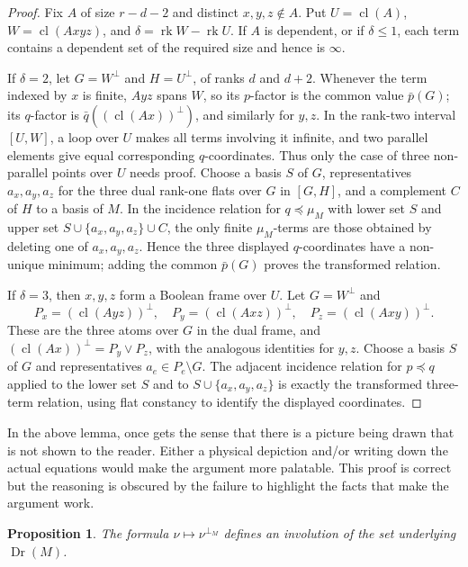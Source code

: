 \documentclass[12pt]{article}
\newcommand{\Dr}{\operatorname{Dr}}
\newcommand{\rk}{\operatorname{rk}}
\newcommand{\cl}{\operatorname{cl}}
\newtheorem{proposition}{Proposition}
\newcommand{\review}[1]{\begin{reviewbox}#1\end{reviewbox}}
\begin{document}
\begin{proof}
Fix $A$ of size $r-d-2$ and distinct $x,y,z\notin A$.  Put
$U=\cl(A)$, $W=\cl(Axyz)$, and $\delta=\rk W-\rk U$.  If $A$ is
dependent, or if $\delta\le1$, each term contains a dependent set of the
required size and hence is $\infty$.

If $\delta=2$, let $G=W^\perp$ and $H=U^\perp$, of ranks $d$ and
$d+2$.  Whenever the term indexed by $x$ is finite, $Ayz$ spans $W$,
so its $p$-factor is the common value $\bar p(G)$; its $q$-factor is
$\bar q((\cl(Ax))^\perp)$, and similarly for $y,z$.  In the rank-two
interval $[U,W]$, a loop over $U$ makes all terms involving it
infinite, and two parallel elements give equal corresponding
$q$-coordinates.  Thus only the case of three non-parallel points over
$U$ needs proof.  Choose a basis $S$ of $G$, representatives
$a_x,a_y,a_z$ for the three dual rank-one flats over $G$ in $[G,H]$,
and a complement $C$ of $H$ to a basis of $M$.  In the incidence
relation for $q\preceq\mu_M$ with lower set $S$ and upper set
$S\cup\{a_x,a_y,a_z\}\cup C$, the only finite $\mu_M$-terms are those
obtained by deleting one of $a_x,a_y,a_z$.  Hence the three displayed
$q$-coordinates have a non-unique minimum; adding the common
$\bar p(G)$ proves the transformed relation.

If $\delta=3$, then $x,y,z$ form a Boolean frame over $U$.  Let
$G=W^\perp$ and
\[
 P_x=(\cl(Ayz))^\perp,\quad P_y=(\cl(Axz))^\perp,\quad
 P_z=(\cl(Axy))^\perp .
\]
These are the three atoms over $G$ in the dual frame, and
$(\cl(Ax))^\perp=P_y\vee P_z$, with the analogous identities for
$y,z$.  Choose a basis $S$ of $G$ and representatives
$a_e\in P_e\setminus G$.  The adjacent incidence relation for
$p\preceq q$ applied to the lower set $S$ and to
$S\cup\{a_x,a_y,a_z\}$ is exactly the transformed three-term relation,
using flat constancy to identify the displayed coordinates.
\end{proof}
\review{In the above lemma, once gets the sense that there is a picture being drawn that is not shown to the reader. Either a physical depiction and/or writing down the actual equations would make the argument more palatable. This proof is correct but the reasoning is obscured by the failure to highlight the facts that make the argument work.}

\begin{proposition}\label{prop:set}
The formula $\nu\mapsto\nu^{\perp_M}$ defines an involution of the set
underlying $\Dr(M)$.
\end{proposition}
\end{document}
